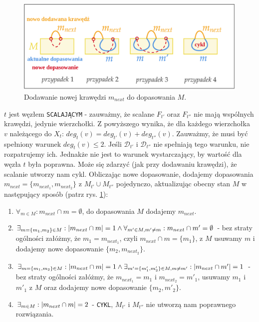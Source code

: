 \documentclass[12pt, oneside]{report}
\begin{document}
\begin{figure}
\centering
\label{hamiltonian_merge}
\includegraphics[width=16cm]{hamiltonian_merge.png}
\caption{Dodawanie nowej krawędzi $m_{next}$ do dopasowania $M$.}
\end{figure}
$$$$
$t$ jest węzłem \texttt{SCALAJĄCYM} - zauważmy, że scalane $F_{t'}$ oraz $F_{t''}$ nie mają wspólnych krawędzi, jedynie wierzchołki. Z powyższego wynika, że dla każdego wierzchołka $v$ należącego do $X_t$: $deg_t(v) = deg_{t'}(v) + deg_{t''}(v)$. Zauważmy, że musi być spełniony warunek $deg_t(v) \leq 2$. Jeśli $\mathcal{D}_{t'}$ i $\mathcal{D}_{t''}$ nie spełniają tego warunku, nie rozpatrujemy ich. Jednakże nie jest to warunek wystarczający, by wartość dla węzła $t$ była poprawna. Może się zdarzyć (jak przy dodawaniu krawędzi), że scalanie utworzy nam cykl. Obliczając nowe dopasowanie, dodajemy dopasowania $m_{next} = \{m_{next_1}, m_{next_2}\}$ z $M_{t'} \cup M_{t''}$ pojedynczo, aktualizując obecny stan $M$ w następujący sposób (patrz rys. \ref{hamiltonian_merge}):
\begin{enumerate}
\item $\forall_{m \in M}: m_{next} \cap m = \emptyset$, do dopasowania $M$ dodajemy $m_{next}$.
\item $\exists_{m = \{m_1, m_2\} \in M}: \abs{m_{next} \cap m} = 1 \wedge \forall_{m' \in M, m' \ne m}: m_{next} \cap m' = \emptyset$ - bez straty ogólności załóżmy, że $m_1 = m_{next_1}$, czyli $m_{next} \cap m = \{m_1\}$, z $M$ usuwamy $m$ i dodajemy nowe dopasowanie $\{m_2, m_{next_2}\}$.
\item $\exists_{m = \{m_1, m_2\} \in M}: \abs{m_{next} \cap m} = 1 \wedge \exists_{m' = \{m'_1, m'_2\} \in M, m \ne m'}: \abs{m_{next} \cap m'} = 1$ - bez straty ogólności załóżmy, że $m_{next_1} = m_1$ i $m_{next_2} = m'_1$, usuwamy $m_1$ i $m'_1$ z $M$ oraz dodajemy nowe dopasowanie $\{m_2, m'_2\}$.
\item $\exists_{m \in M}: \abs{m_{next} \cap m} = 2$ - \texttt{CYKL}, $M_{t'}$ i $M_{t''}$ nie utworzą nam poprawnego rozwiązania.
\end{enumerate}
\end{document}
